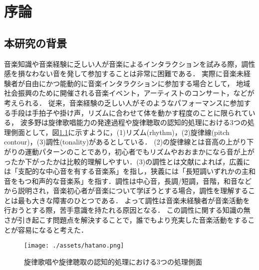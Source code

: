 \chapter{序論}
\label{chap:intro}

\section{本研究の背景}
音楽知識や音楽経験に乏しい人が音楽によるインタラクションを試みる際，調性感を損なわない音を発して参加することは非常に困難である．
実際に音楽未経験者が自由にかつ能動的に音楽インタラクションに参加する場合として，
地域社会振興のために開催される音楽イベント，アーティストのコンサート，などが考えられる．
従来，音楽経験の乏しい人がそのようなパフォーマンスに参加する手段は手拍子や掛け声，リズムに合わせて体を動かす程度のことに限られている，
波多野\cite{hatano2007}は旋律歌唱能力の発達過程や旋律聴取の認知的処理における3つの処理側面として，図\ref{img:hatano}に示すように，(1)リズム(rhythm)，(2)旋律線(pitch contour)，(3)調性(tonality)があるとしている．
(2)の旋律線とは音高の上がり下がりの運動パターンのことであり，初心者でもリズムやおおまかになら音が上がったか下がったかは比較的理解しやすい．(3)の調性とは文献\cite{ongakunotomo1979}によれば，広義には「支配的な中心音を有する音楽系」を指し，狭義には「長短調いずれかの主和音をもつ和声的な音楽系」を指す．調性は中心音，長調/短調，音階，和音などから説明され，音楽初心者が音楽について学ぼうとする場合，調性を理解することは最も大きな障害のひとつである．
よって調性は音楽未経験者が音楽活動を行おうとする際，苦手意識を持たれる原因となる．
この調性に関する知識の無さが引き起こす問題点を解決することで，誰でもより充実した音楽活動をすることが容易になると考えた．

\begin{figure}[t]
	\begin{center}
		\texttt{[image: ./assets/hatano.png]}
		 \caption{旋律歌唱や旋律聴取の認知的処理における3つの処理側面}
		\label{img:hatano}
	\end{center}
\end{figure}
